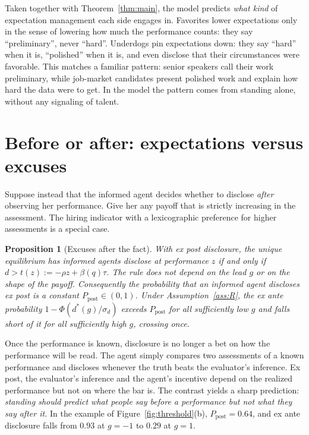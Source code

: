 \documentclass[11pt]{article}
\newtheorem{proposition}{Proposition}
\theoremstyle{definition}
\newcommand{\sd}{\sigma_d}
\begin{document}
Taken together with Theorem~\ref{thm:main}, the model predicts \emph{what kind} of expectation management each side engages in. Favorites lower expectations only in the sense of lowering how much the performance counts: they say ``preliminary'', never ``hard''. Underdogs pin expectations down: they say ``hard'' when it is, ``polished'' when it is, and even disclose that their circumstances were favorable. This matches a familiar pattern: senior speakers call their work preliminary, while job-market candidates present polished work and explain how hard the data were to get. In the model the pattern comes from standing alone, without any signaling of talent.

\section{Before or after: expectations versus excuses}\label{sec:timing}

Suppose instead that the informed agent decides whether to disclose \emph{after} observing her performance. Give her any payoff that is strictly increasing in the assessment. The hiring indicator with a lexicographic preference for higher assessments is a special case.

\begin{proposition}[Excuses after the fact]\label{prop:timing}
With ex post disclosure, the unique equilibrium has informed agents disclose at performance $z$ if and only if $d>t(z):=-\rho z+\beta(q)\tau$. The rule does not depend on the lead $g$ or on the shape of the payoff. Consequently the probability that an informed agent discloses ex post is a constant $P_{\mathrm{post}}\in(0,1)$. Under Assumption~\ref{ass:R}, the ex ante probability $1-\Phi(d^*(g)/\sd)$ exceeds $P_{\mathrm{post}}$ for all sufficiently low $g$ and falls short of it for all sufficiently high $g$, crossing once.
\end{proposition}

Once the performance is known, disclosure is no longer a bet on how the performance will be read. The agent simply compares two assessments of a known performance and discloses whenever the truth beats the evaluator's inference. Ex post, the evaluator's inference and the agent's incentive depend on the realized performance but not on where the bar is. The contrast yields a sharp prediction: \emph{standing should predict what people say before a performance but not what they say after it.} In the example of Figure~\ref{fig:threshold}(b), $P_{\mathrm{post}}=0.64$, and ex ante disclosure falls from $0.93$ at $g=-1$ to $0.29$ at $g=1$.
\end{document}

